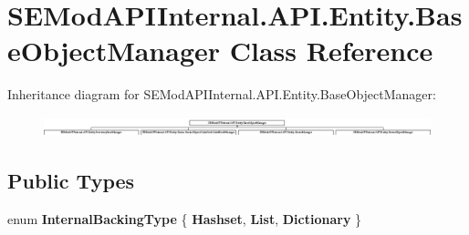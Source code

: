 \hypertarget{class_s_e_mod_a_p_i_internal_1_1_a_p_i_1_1_entity_1_1_base_object_manager}{}\section{S\+E\+Mod\+A\+P\+I\+Internal.\+A\+P\+I.\+Entity.\+Base\+Object\+Manager Class Reference}
\label{class_s_e_mod_a_p_i_internal_1_1_a_p_i_1_1_entity_1_1_base_object_manager}
Inheritance diagram for S\+E\+Mod\+A\+P\+I\+Internal.\+A\+P\+I.\+Entity.\+Base\+Object\+Manager\+:\begin{figure}[H]
\begin{center}
\leavevmode
\includegraphics[height=0.589474cm]{class_s_e_mod_a_p_i_internal_1_1_a_p_i_1_1_entity_1_1_base_object_manager}
\end{center}
\end{figure}
\subsection*{Public Types}
\begin{DoxyCompactItemize}
\item 
\hypertarget{class_s_e_mod_a_p_i_internal_1_1_a_p_i_1_1_entity_1_1_base_object_manager_ac8cddfb1117ee01eed27c2bd3362f1c3}{}enum {\bfseries Internal\+Backing\+Type} \{ {\bfseries Hashset}, 
{\bfseries List}, 
{\bfseries Dictionary}
 \}\label{class_s_e_mod_a_p_i_internal_1_1_a_p_i_1_1_entity_1_1_base_object_manager_ac8cddfb1117ee01eed27c2bd3362f1c3}

\end{DoxyCompactItemize}
